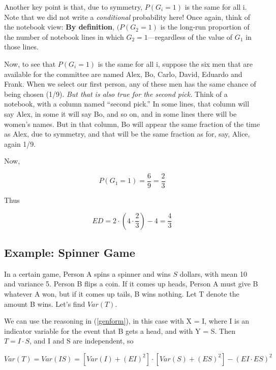 Another key point is that, due to symmetry, $P(G_i = 1)$ is the same for
all i.  Note that we did not write a {\it conditional} probability
here!  Once again, think of the notebook view:  {\large \bf By
definition}, $(P(G_2 = 1)$ is the long-run proportion of the number of
notebook lines in which $G_2 = 1$---regardless of the value of $G_1$ in
those lines.

Now, to see that $P(G_i = 1)$ is the same for all i, suppose the six men
that are available for the committee are named Alex, Bo, Carlo, David,
Eduardo and Frank.  When we select our first person, any of these men
has the same chance of being chosen (1/9).  {\it But that is also true
for the second pick.}  Think of a notebook, with a column named ``second
pick.''  In some lines, that column will say Alex, in some it will say
Bo, and so on, and in some lines there will be women's names.  But in
that column, Bo will appear the same fraction of the time as Alex, due
to symmetry, and that will be the same fraction as for, say, Alice,
again 1/9.

Now,

\begin{equation}
P(G_1 = 1) = \frac{6}{9} = \frac{2}{3}
\end{equation}

Thus 

\begin{equation}
ED = 2 \cdot (4 \cdot \frac{2}{3}) -4  = \frac{4}{3}
\end{equation}

\subsection{Example:  Spinner Game}

In a certain game, Person A spins a spinner and wins $S$ dollars, with
mean 10 and variance 5.  Person B flips a coin.  If it comes up heads,
Person A must give B whatever A won, but if it comes up tails, B wins
nothing.  Let T denote the amount B wins.  Let's find $Var(T)$.

We can use the reasoning in (\ref{genform}), in this case with X = I,
where I is an indicator variable for the event that B gets a head, and
with Y = S.  Then $T = I \cdot S$, and I and S are independent, so

\begin{equation}
Var(T) = Var(IS) = 
[Var(I) + (EI)^2] \cdot
[Var(S) + (ES)^2] - (EI \cdot ES)^2 
\end{equation}

